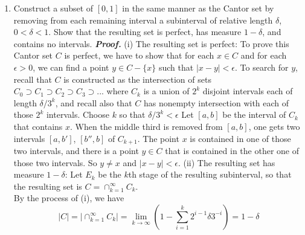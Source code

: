 \documentclass[a4paper,11pt]{article}
\begin{document}
\begin{enumerate}
\item Construct a subset of $[0,1]$ in the same manner as the Cantor set by removing from each remaining interval a subinterval of relative length $\delta$, $0 < \delta < 1$. Show that the resulting set is perfect, has measure $1-\delta$, and contains no intervals.
\newline
\newline
\textit{\textbf {Proof.}}
\newline
(i) The resulting set is perfect:
\newline
To prove this Cantor set $C$ is perfect, we have to show that for each $x \in C$ and for each $\epsilon > 0$, we can find a point $y \in C - \{ x \}$ such that $|x-y| < \epsilon$.
\newline
\newline
To search for $y$, recall that $C$ is constructed as the intersection of sets $C_0 \supset C_1 \supset C_2 \supset C_3 \supset ...$ where $C_k$ is a union of $2^k$ disjoint intervals each of length $\delta / 3^k$, and recall also that $C$ has nonempty intersection with each of those $2^k$ intervals.
\newline
\newline
Choose $k$ so that $\delta / 3^k < \epsilon$
\newline
\newline
Let $[a,b]$ be the interval of $C_k$ that contains $x$.
\newline
\newline
When the middle third is removed from $[a,b]$,  one gets two intervals $[a,b']$, $[b'',b]$ of $C_{k+1}$. The point $x$ is contained in one of those two intervals, and there is a point $y \in C$ that is contained in the other one of those two intervals. So $y \neq x$ and $|x - y| < \epsilon$.
\newline
\newline
(ii) The resulting set has measure $1-\delta$:
\newline
Let $E_k$ be the $k$th stage of the resulting subinterval, so that the resulting set is $C = \cap_{k=1}^{\infty} C_k$.\\
By the process of (i), we have
$$|C| = |\cap_{k=1}^{\infty} C_k| = \lim_{k \to \infty} (1 - \sum_{i=1}^{k} 2^{i-1} \delta 3^{-i}) = 1 - \delta$$
\newline
\newline



\end{enumerate}
\end{document}
